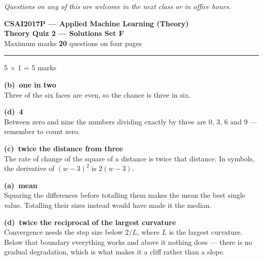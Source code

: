 \documentclass[10pt,a4paper]{article}
\newcommand{\SetLetter}{}
\newcommand{\parthead}[2]{\vspace{2pt}\noindent\rule{\linewidth}{0.4pt}\par\vspace{2pt}%
  \noindent{\bfseries Part #1}\hfill{\small #2}\par\vspace{1pt}}
\newcommand{\sol}[1]{\textbf{#1}}
\begin{document}
\vfill

{\footnotesize\itshape Questions on any of this are welcome in the next class or in office hours.}

\newpage


\renewcommand{\SetLetter}{F}\setcounter{page}{1}

\begin{center}
{\large\bfseries CSAI2017P --- Applied Machine Learning (Theory)}\\[2pt]
{\large\bfseries Theory Quiz 2 --- Solutions \quad\textbullet\quad Set F}\\[3pt]
{\small Maximum marks \textbf{20} \quad\textbullet{} questions on four pages}
\end{center}
\vspace{2pt}

\noindent{}
\vspace{3pt}


\parthead{A --- Multiple choice}{5 $\times$ 1 = 5 marks}

\begin{sA}

  \item \sol{(b)\ one in two}\\ Three of the six faces are even, so the chance is three in six.

  \item \sol{(d)\ 4}\\ Between zero and nine the numbers dividing exactly by three are $0$, $3$, $6$ and $9$ --- remember to count zero.

  \item \sol{(c)\ twice the distance from three}\\ The rate of change of the square of a distance is twice that distance. In symbols, the derivative of $(w-3)^2$ is $2(w-3)$.

  \item \sol{(a)\ mean}\\ Squaring the differences before totalling them makes the mean the best single value. Totalling their sizes instead would have made it the median.

  \item \sol{(d)\ twice the reciprocal of the largest curvature}\\ Convergence needs the step size below $2/L$, where $L$ is the largest curvature. Below that boundary everything works and above it nothing does --- there is no gradual degradation, which is what makes it a cliff rather than a slope.

\end{sA}
\end{document}

